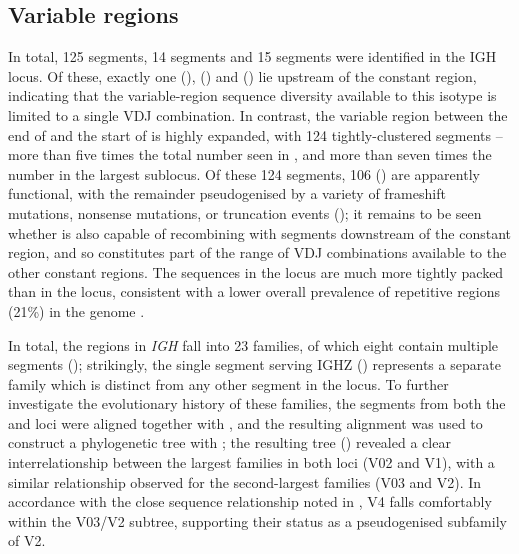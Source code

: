 	
\subsection{Variable regions}
\label{sec:xma-locus-variable}

In total, 125 \vh segments, 14 \dh segments and 15 \jh segments were identified in the \Xma IGH locus. Of these, exactly one \vh (), \dh () and \jh () lie upstream of the  constant region, indicating that the variable-region sequence diversity available to this isotype is limited to a single VDJ combination. In contrast, the variable region between the end of  and the start of  is highly expanded, with 124 tightly-clustered \vh segments -- more than five times the total number seen in \Nfu, and more than seven times the number in the largest \Nfu sublocus. Of these 124 \vh segments, 106 () are apparently functional, with the remainder pseudogenised by a variety of frameshift mutations, nonsense mutations, or truncation events (); it remains to be seen whether  is also capable of recombining with \dh segments downstream of the  constant region, and so constitutes part of the range of VDJ combinations available to the other constant regions. The \vh sequences in the \Xma locus are much more tightly packed than in the \Nfu locus, consistent with a lower overall prevalence of repetitive regions (21\%) in the \Xma genome \parencite{yuan2018repeats}.
	
In total, the \vh regions in \Xma \textit{IGH} fall into 23 families, of which eight contain multiple segments (); strikingly, the single \vh segment serving IGHZ () represents a separate family which is distinct from any other segment in the locus. To further investigate the evolutionary history of these families, the \vh segments from both the \Xma and \Nfu \igh{} loci were aligned together with , and the resulting alignment was used to construct a phylogenetic tree with ; the resulting tree () revealed a clear interrelationship between the largest families in both loci (\Xma V02 and \Nfu V1), with a similar relationship observed for the second-largest families (\Xma V03 and \Nfu V2). 
In accordance with the close sequence relationship noted in , \Nfu V4 falls comfortably within the V03/V2 subtree, supporting their status as a pseudogenised subfamily of \Nfu V2.
		
